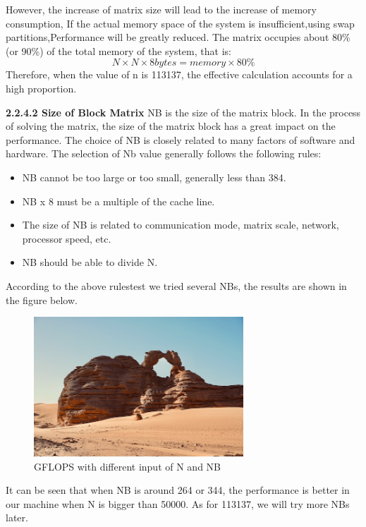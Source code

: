 \documentclass[a4paper,12pt]{article}
\begin{document}
However, the increase of matrix size will lead to the increase of memory consumption, If the actual memory space of the system is insufficient,using swap partitions,Performance will be greatly reduced. The matrix occupies about 80\% (or 90\%) of the total memory of the system, that is:
\begin{equation*}
N \times N \times 8bytes = memory \times 80\%
\end{equation*}
Therefore, when the value of n is 113137, the effective calculation accounts for a high proportion.

\textbf{2.2.4.2 Size of Block Matrix}
NB is the size of the matrix block. In the process of solving the matrix, the size of the matrix block has a great impact on the performance. The choice of NB is closely related to many factors of software and hardware. The selection of Nb value generally follows the following rules:
\begin{itemize}
    \item NB cannot be too large or too small, generally less than 384.
    \item NB x 8 must be a multiple of the cache line.
    \item The size of NB is related to communication mode, matrix scale, network, processor speed, etc.
    \item NB should be able to divide N.
\end{itemize}
According to the above rulestest we tried several NBs, the results are shown in the figure below.

\begin{figure}[H]
    \centering
    \includegraphics[width=0.7\textwidth]{GFLOPS_NB.png}
    \caption{GFLOPS with different input of N and NB}
    \label{fig:gflops_nb}
\end{figure}

It can be seen that when NB is around 264 or 344, the performance is better in our machine when N is bigger than 50000. As for 113137, we will try more NBs later.
\end{document}

